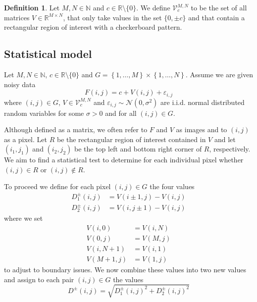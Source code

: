 \documentclass[a4paper,12pt]{article}
\theoremstyle{plain}
\theoremstyle{definition}
\newtheorem{definition}[theorem]{Definition}
\theoremstyle{remark}
\begin{document}
\begin{definition}
	Let $M, N \in \mathbb{N}$ and $c \in \mathbb{R} \setminus \{ 0 \}$. We define $\mathcal{V}_c^{M, N}$ to be the set of all matrices $V \in \mathbb{R}^{M \times N}$, that only take values in the set $\{ 0, \pm c \}$ and that contain a rectangular region of interest with a checkerboard pattern.
\end{definition}

\newpage

\subsection{Statistical model}

Let $M, N \in \mathbb{N}$, $c \in \mathbb{R} \setminus \{ 0 \}$ and $G = \left\{ 1, \dots, M \right\} \times \left\{ 1, \dots, N \right\}$. Assume we are given noisy data
\begin{equation}\label{image}
	F(i, j) = c + V(i, j) + \varepsilon_{i, j}
\end{equation}
where $(i, j) \in G$, $V \in \mathcal{V}_c^{M, N}$ and $\varepsilon_{i, j} \sim \mathcal{N}(0, \sigma^2)$ are i.i.d. normal distributed random variables for some $\sigma > 0$ and for all $(i, j) \in G$.

Although defined as a matrix, we often refer to $F$ and $V$ as images and to $(i, j)$ as a pixel. Let $R$ be the rectangular region of interest contained in $V$ and let $(i_1, j_1)$ and $(i_2, j_2)$ be the top left and bottom right corner of $R$, respectively. We aim to find a statistical test to determine for each individual pixel whether $(i, j) \in R$ or $(i, j) \notin R$.

To proceed we define for each pixel $(i, j) \in G$ the four values
\begin{align}
	D^\pm_1(i, j) &= V(i \pm 1, j) - V(i, j) \label{D1} \\
	D^\pm_2(i, j) &= V(i, j \pm 1) - V(i, j) \label{D2}
\end{align}
where we set
\begin{align*}
	V(i, 0) &= V(i, N) \\
	V(0, j) &= V(M, j) \\
	V(i, N+1) &= V(i, 1) \\
	V(M+1, j) &= V(1, j)
\end{align*}
to adjust to boundary issues. We now combine these values into two new values and assign to each pair $(i, j) \in G$ the values
\begin{equation}\label{D}
	D^\pm(i, j) = \sqrt{D_1^\pm(i, j)^2 + D_2^\pm(i, j)^2}
\end{equation}
\end{document}
